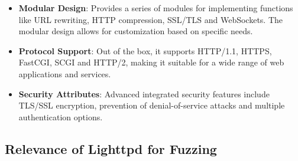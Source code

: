 \begin{itemize}
    \item \textbf{Modular Design}: Provides a series of modules for implementing functions like URL rewriting, HTTP compression, SSL/TLS and WebSockets. The modular design allows for customization based on specific needs.
    
    \item \textbf{Protocol Support}: Out of the box, it supports HTTP/1.1, HTTPS, FastCGI, SCGI and HTTP/2, making it suitable for a wide range of web applications and services.
    
    \item \textbf{Security Attributes}: Advanced integrated security features include TLS/SSL encryption, prevention of denial-of-service attacks and multiple authentication options.
\end{itemize}

\subsection{Relevance of Lighttpd for Fuzzing}

